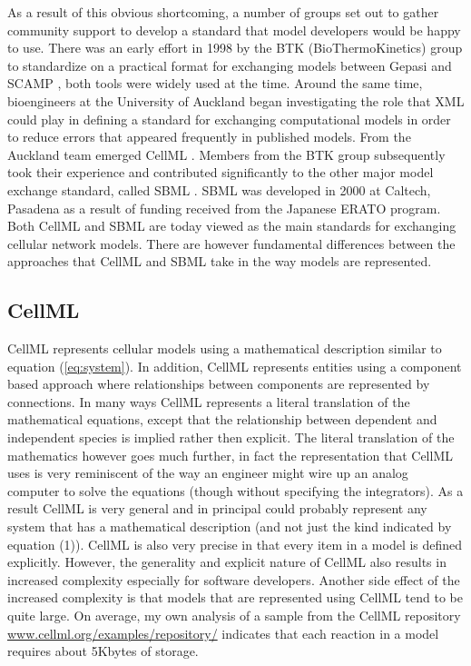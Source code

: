 \documentclass[12pt]{article}
\begin{document}
As a result of this obvious shortcoming, a number of groups set
out to gather community support to develop a standard that model
developers would be happy to use.  There was an early effort in
1998 by the BTK (BioThermoKinetics) group to standardize on a
practical format for exchanging models between Gepasi
\cite{Gepasi:1993} and SCAMP \cite{SauroF91}, both tools were
widely used at the time. Around the same time, bioengineers at the
University of Auckland began investigating the role that XML \cite{harold:2001} could
play in defining a standard for exchanging computational models in
order to reduce errors that appeared frequently in published
models. From the Auckland team emerged CellML
\cite{LloydCellML2004}. Members from the BTK group subsequently
took their experience and contributed significantly to the other
major model exchange standard, called SBML \cite{hucka:2002d}.
SBML was developed in 2000 at Caltech, Pasadena as a result of
funding received from the Japanese ERATO program. Both CellML and
SBML are today viewed as the main standards for exchanging
cellular network models. There are however fundamental differences
between the approaches that CellML and SBML take in the way models
are represented.


\subsection{CellML}

CellML \cite{LloydCellML2004} represents cellular models using a
mathematical description similar to equation (\ref{eq:system}). In
addition, CellML represents entities using a component based
approach where relationships between components are represented by
connections. In many ways CellML represents a literal translation of
the mathematical equations, except that the relationship between
dependent and independent species is implied rather then explicit.
The literal translation of the mathematics however goes much
further, in fact the representation that CellML uses is very
reminiscent of the way an engineer might wire up an analog computer
to solve the equations (though without specifying the integrators).
As a result CellML is very general and in principal could probably
represent any system that has a mathematical description (and not
just the kind indicated by equation (1)). CellML is also very
precise in that every item in a model is defined explicitly.
However, the generality and explicit nature of CellML also results
in increased complexity especially for software developers. Another
side effect of the increased complexity is that models that are
represented using CellML tend to be quite large. On average, my own
analysis of a sample from the CellML repository
\url{www.cellml.org/examples/repository/} indicates that each
reaction in a model requires about 5Kbytes of storage.
\end{document}
